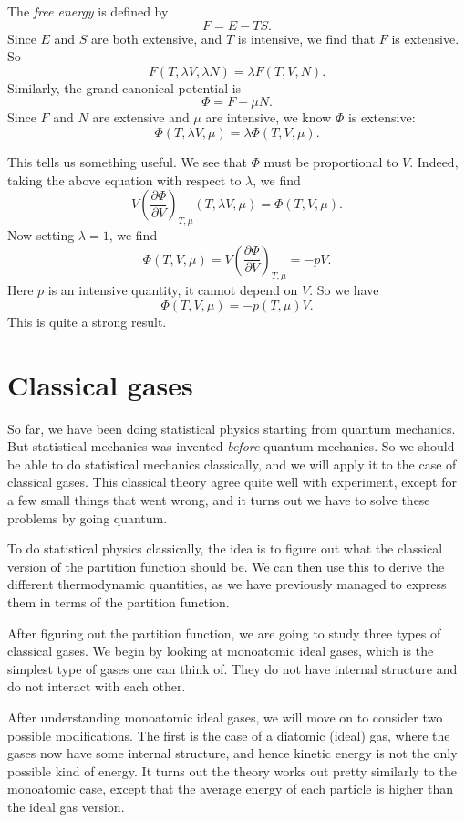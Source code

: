 \documentclass[a4paper]{article}
\begin{document}
\begin{eg}
  The \emph{free energy} is defined by
  \[
    F = E - TS.
  \]
  Since $E$ and $S$ are both extensive, and $T$ is intensive, we find that $F$ is extensive. So
  \[
    F (T, \lambda V, \lambda N) = \lambda F(T, V, N).
  \]
  Similarly, the grand canonical potential is
  \[
    \Phi = F - \mu N.
  \]
  Since $F$ and $N$ are extensive and $\mu$ are intensive, we know $\Phi$ is extensive:
  \[
    \Phi(T, \lambda V, \mu) = \lambda \Phi(T, V, \mu).
  \]
\end{eg}
This tells us something useful. We see that $\Phi$ must be proportional to $V$. Indeed, taking the above equation with respect to $\lambda$, we find
\[
  V \left(\frac{\partial \Phi}{\partial V}\right)_{T, \mu} (T, \lambda V, \mu) = \Phi(T, V, \mu).
\]
Now setting $\lambda = 1$, we find
\[
  \Phi(T, V, \mu) = V \left(\frac{\partial \Phi}{\partial V} \right)_{T, \mu} = -pV.
\]
Here $p$ is an intensive quantity, it cannot depend on $V$. So we have
\[
  \Phi(T, V, \mu) = -p(T, \mu) V.
\]
This is quite a strong result.

\section{Classical gases}
So far, we have been doing statistical physics starting from quantum mechanics. But statistical mechanics was invented \emph{before} quantum mechanics. So we should be able to do statistical mechanics classically, and we will apply it to the case of classical gases. This classical theory agree quite well with experiment, except for a few small things that went wrong, and it turns out we have to solve these problems by going quantum.

To do statistical physics classically, the idea is to figure out what the classical version of the partition function should be. We can then use this to derive the different thermodynamic quantities, as we have previously managed to express them in terms of the partition function.

After figuring out the partition function, we are going to study three types of classical gases. We begin by looking at monoatomic ideal gases, which is the simplest type of gases one can think of. They do not have internal structure and do not interact with each other.

After understanding monoatomic ideal gases, we will move on to consider two possible modifications. The first is the case of a diatomic (ideal) gas, where the gases now have some internal structure, and hence kinetic energy is not the only possible kind of energy. It turns out the theory works out pretty similarly to the monoatomic case, except that the average energy of each particle is higher than the ideal gas version.
\end{document}
